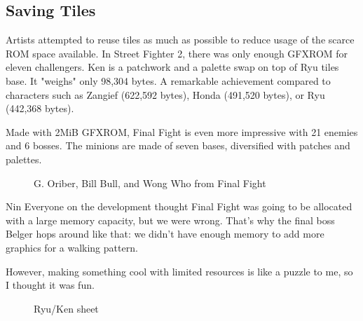\subsection{Saving Tiles}
Artists attempted to reuse tiles as much as possible to reduce usage of the scarce ROM space available. In Street Fighter 2, there was only enough GFXROM for eleven challengers. Ken is a patchwork and a palette swap on top of Ryu tiles base. It "weighs" only 98,304 bytes. A remarkable achievement compared to characters such as Zangief (622,592 bytes), Honda (491,520 bytes), or Ryu (442,368 bytes).

\begin{minipage}[t]{0.19\linewidth}
\end{minipage}%
\hfill%
\begin{minipage}[t]{0.19\linewidth}
\end{minipage}
\hfill%
\begin{minipage}[t]{0.19\linewidth}
\end{minipage}%
\hfill%
\begin{minipage}[t]{0.19\linewidth}
\end{minipage}
\hfill%
\begin{minipage}[t]{0.19\linewidth}
\end{minipage}


Made with 2MiB GFXROM, Final Fight is even more impressive with 21 enemies and 6 bosses. The minions are made of seven bases, diversified with patches and palettes.

\begin{figure}[H]
\caption*{G. Oriber, Bill Bull, and Wong Who from Final Fight}
\end{figure}


\begin{q}{Nin\cite{1991_retro}}
Everyone on the development thought Final Fight was going to be allocated with a large memory capacity, but we were wrong.
That's why the final boss Belger hops around like that: we didn't have enough memory to add more graphics for a walking pattern. 

However, making something cool with limited resources is like a puzzle to me, so I thought it was fun. 
\end{q}


 \begin{figure}[H]
\caption*{Ryu/Ken sheet}
\end{figure}

